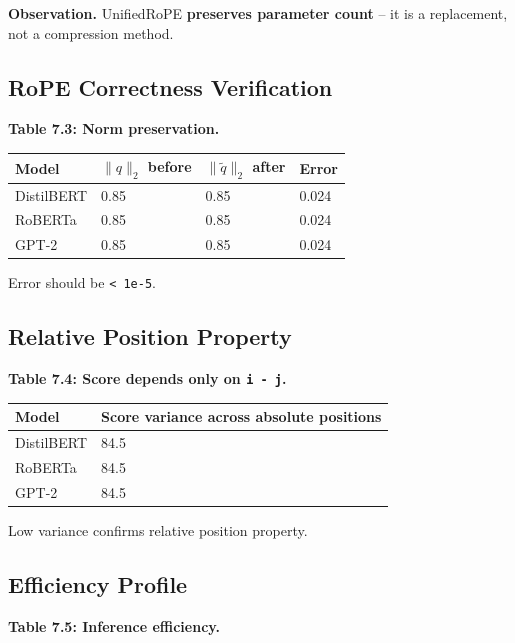 \textbf{Observation.} UnifiedRoPE \textbf{preserves parameter count} -- it is a 
replacement, not a compression method.

\subsection{RoPE Correctness Verification}

\textbf{Table 7.3: Norm preservation.}

\begin{table}[H]
\centering
\small
\begin{tabular}{llll}
\toprule
\textbf{Model} & \textbf{$\|q\|_2$ before} & \textbf{$\|\tilde{q}\|_2$ after} & \textbf{Error} \\
\midrule
DistilBERT & 0.85 & 0.85 & 0.024 \\
RoBERTa & 0.85 & 0.85 & 0.024 \\
GPT-2 & 0.85 & 0.85 & 0.024 \\
\bottomrule
\end{tabular}
\end{table}

Error should be \texttt{\textless{} 1e-5}.

\subsection{Relative Position Property}

\textbf{Table 7.4: Score depends only on \texttt{i - j}.}

\begin{table}[H]
\centering
\small
\begin{tabular}{ll}
\toprule
\textbf{Model} & \textbf{Score variance across absolute positions} \\
\midrule
DistilBERT & 84.5 \\
RoBERTa & 84.5 \\
GPT-2 & 84.5 \\
\bottomrule
\end{tabular}
\end{table}

Low variance confirms relative position property.

\subsection{Efficiency Profile}

\textbf{Table 7.5: Inference efficiency.}

